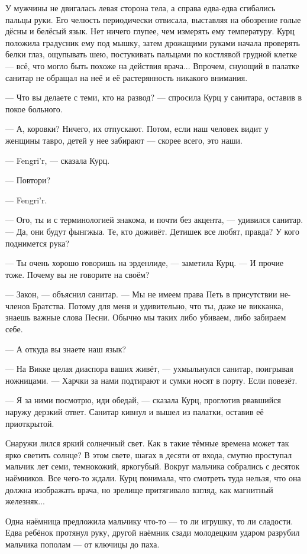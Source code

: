 У мужчины не двигалась левая сторона тела, а справа едва-едва сгибались пальцы руки.
Его челюсть периодически отвисала, выставляя на обозрение голые дёсны и белёсый язык.
Нет ничего глупее, чем измерять ему температуру.
Курц положила градусник ему под мышку, затем дрожащими руками начала проверять белки глаз, ощупывать шею, постукивать пальцами по костлявой грудной клетке --- всё, что могло быть похоже на действия врача...
Впрочем, снующий в палатке санитар не обращал на неё и её растерянность никакого внимания.

--- Что вы делаете с теми, кто на развод? --- спросила Курц у санитара, оставив в покое больного.

--- А, коровки?
Ничего, их отпускают.
Потом, если наш человек видит у женщины тавро, детей у нее забирают --- скорее всего, это наши.

--- Fengri'r, --- сказала Курц.

--- Повтори?

--- Fengri'r.

--- Ого, ты и с терминологией знакома, и почти без акцента, --- удивился санитар.
--- Да, они будут фынгжыа.
Те, кто доживёт.
Детишек все любят, правда?
У кого поднимется рука?

--- Ты очень хорошо говоришь на эрденлиде, --- заметила Курц.
--- И прочие тоже.
Почему вы не говорите на своём?

--- Закон, --- объяснил санитар.
--- Мы не имеем права Петь в присутствии не-членов Братства.
Потому для меня и удивительно, что ты, даже не викканка, знаешь важные слова Песни.
Обычно мы таких либо убиваем, либо забираем себе.

--- А откуда вы знаете наш язык?

--- На Викке целая диаспора ваших живёт, --- ухмыльнулся санитар, поигрывая ножницами.
--- Харчки за нами подтирают и сумки носят в порту.
Если повезёт.

--- Я за ними посмотрю, иди обедай, --- сказала Курц, проглотив рвавшийся наружу дерзкий ответ.
Санитар кивнул и вышел из палатки, оставив её приоткрытой.

Снаружи лился яркий солнечный свет.
Как в такие тёмные времена может так ярко светить солнце?
В этом свете, шагах в десяти от входа, смутно проступал мальчик лет семи, темнокожий, яркогубый.
Вокруг мальчика собрались с десяток наёмников.
Все чего-то ждали.
Курц понимала, что смотреть туда нельзя, что она должна изображать врача, но зрелище притягивало взгляд, как магнитный железняк...

Одна наёмница предложила мальчику что-то --- то ли игрушку, то ли сладости.
Едва ребёнок протянул руку, другой наёмник сзади молодецким ударом разрубил мальчика пополам --- от ключицы до паха.

